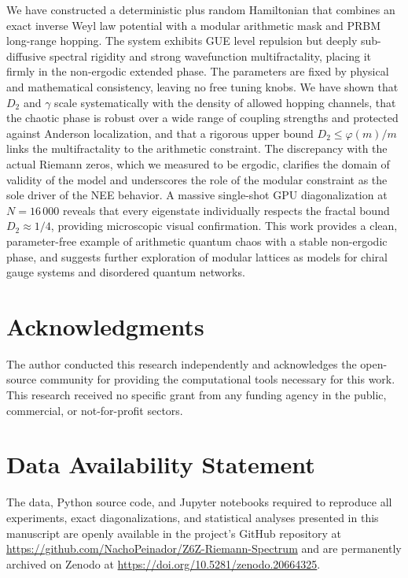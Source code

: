 \documentclass[aps,prl,preprint,superscriptaddress,floatfix]{revtex4-2}
\begin{document}
We have constructed a deterministic plus random Hamiltonian that combines an exact inverse Weyl law potential with a modular arithmetic mask and PRBM long-range hopping. The system exhibits GUE level repulsion but deeply sub-diffusive spectral rigidity and strong wavefunction multifractality, placing it firmly in the non-ergodic extended phase. The parameters are fixed by physical and mathematical consistency, leaving no free tuning knobs. We have shown that $D_2$ and $\gamma$ scale systematically with the density of allowed hopping channels, that the chaotic phase is robust over a wide range of coupling strengths and protected against Anderson localization, and that a rigorous upper bound $D_2 \le \varphi(m)/m$ links the multifractality to the arithmetic constraint. The discrepancy with the actual Riemann zeros, which we measured to be ergodic, clarifies the domain of validity of the model and underscores the role of the modular constraint as the sole driver of the NEE behavior. A massive single-shot GPU diagonalization at $N=16\,000$ reveals that every eigenstate individually respects the fractal bound $D_2\approx 1/4$, providing microscopic visual confirmation. This work provides a clean, parameter-free example of arithmetic quantum chaos with a stable non-ergodic phase, and suggests further exploration of modular lattices as models for chiral gauge systems and disordered quantum networks.


\section*{Acknowledgments}
The author conducted this research independently and acknowledges the open-source community for providing the computational tools necessary for this work. This research received no specific grant from any funding agency in the public, commercial, or not-for-profit sectors.

\section*{Data Availability Statement}
The data, Python source code, and Jupyter notebooks required to reproduce all experiments, exact diagonalizations, and statistical analyses presented in this manuscript are openly available in the project's GitHub repository at \url{https://github.com/NachoPeinador/Z6Z-Riemann-Spectrum} and are permanently archived on Zenodo at \url{https://doi.org/10.5281/zenodo.20664325}. 
\end{document}
